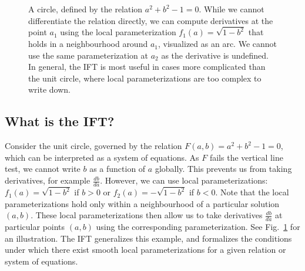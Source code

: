 \documentclass[11pt]{article}
\begin{document}
\begin{figure}
\centering
{}
\caption{
\label{fig:circle}
A circle, defined by the relation $a^2 + b^2 - 1 = 0$.
While we cannot differentiate the relation directly,
we can compute derivatives at the point $a_1$ using the local parameterization $f_1(a)=\sqrt{1-b^2}$ that holds
in a neighbourhood around $a_1$, visualized as an arc.
We cannot use the same parameterization at $a_2$ as the derivative is undefined.
In general, the IFT is most useful in cases more complicated than the unit circle,
where local parameterizations are too complex to write down.
}
\end{figure}


\subsection{What is the IFT?}
Consider the unit circle,
governed by the relation $F(a,b) = a^2 + b^2 - 1 = 0$,
which can be interpreted as a system of equations.
As $F$ fails the vertical line test, we cannot write $b$ as a function of $a$ globally.
This prevents us from taking derivatives, for example $\frac{db}{da}$.
However, we can use local parameterizations: $f_1(a) = \sqrt{1-b^2}$ if $b > 0$
or $f_2(a) = -\sqrt{1-b^2}$ if $b<0$.
Note that the local parameterizations hold only within a neighbourhood of a particular
solution $(a,b)$.
These local parameterizations then allow us to take derivatives $\frac{db}{da}$
at particular points $(a,b)$ using the corresponding parameterization.
See Fig.~\ref{fig:circle} for an illustration.
The IFT generalizes this example, and formalizes the conditions under which there exist
smooth local parameterizations for a given relation or system of equations.
\end{document}
